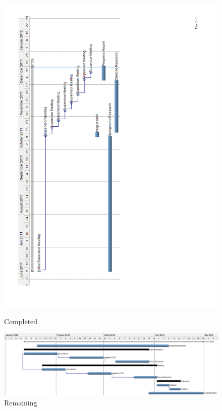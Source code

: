 \documentclass[a4paper,oneside,12pt,openany]{memoir}
\begin{document}
\begin{figure}[ht]
\begin{minipage}[b]{0.5\linewidth}
     \includegraphics[scale=0.7, trim = 12mm 30mm 95mm 30mm, clip]{done}
\caption{Completed}
\label{fig:figure1}
\end{minipage}
\hspace{0.5cm}
\begin{minipage}[b]{0.5\linewidth}
\centering
  \includegraphics[scale=0.5, angle=90, trim = 36mm 0mm 0mm 0mm, clip]{todo}
\caption{Remaining}
\label{fig:figure2}
\end{minipage}
\end{figure}
{}


\end{document}
